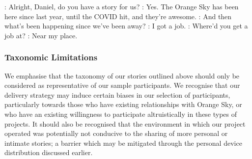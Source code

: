 \begin{drama}

    \volspeaks: Alright, Daniel, do you have a story for us?
    \danspeaks: Yes. The Orange Sky has been here since last year, until the COVID hit, and they're awesome.
    \volspeaks: And then what's been happening since we've been away?
    \danspeaks: I got a job.
    \volspeaks: Where'd you get a job at?
    \danspeaks: Near my place.
\end{drama}

\subsubsection{Taxonomic Limitations}

We emphasise that the taxonomy of our stories outlined above should only be considered as representative of our sample participants. We recognise that our delivery strategy may induce certain biases in our selection of participants, particularly towards those who have existing relationships with Orange Sky, or who have an existing willingness to participate altruistically in these types of projects. It should also be recognised that the environment in which our project operated was potentially not conducive to the sharing of more personal or intimate stories; a barrier which may be mitigated through the personal device distribution discussed earlier.